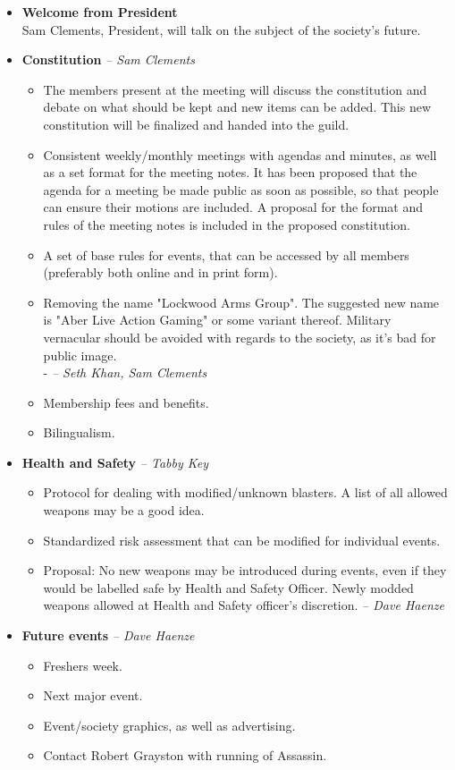 \documentclass{article}
\newcommand{\by}[1]{\hfill {\em-- #1}}
\begin{document}
	\begin{itemize}
		\item \textbf{Welcome from President} \\ Sam Clements, President, will talk on the subject of the society's future.
		\item \textbf{Constitution} \by{Sam Clements}
		\begin{itemize}
			\item The members present at the meeting will discuss the constitution and debate on what should be kept and new items can be added. This new constitution will be finalized and handed into the guild.
			\item Consistent weekly/monthly meetings with agendas and minutes, as well as a set format for the meeting notes. It has been proposed that the agenda for a meeting be made public as soon as possible, so that people can ensure their motions are included. A proposal for the format and rules of the meeting notes is included in the proposed constitution.
			\item A set of base rules for events, that can be accessed by all members (preferably both online and in print form).
			\item Removing the name "Lockwood Arms Group". The suggested new name is "Aber Live Action Gaming" or some variant thereof. Military vernacular should be avoided with regards to the society, as it's bad for public image. \\ - \by{Seth Khan, Sam Clements}
			\item Membership fees and benefits.
			\item Bilingualism.
		\end{itemize}

		\item \textbf{Health and Safety} \by{Tabby Key}
		\begin{itemize}
			\item Protocol for dealing with modified/unknown blasters. A list of all allowed weapons may be a good idea.
			\item Standardized risk assessment that can be modified for individual events.
			\item Proposal: No new weapons may be introduced during events, even if they would be labelled safe by Health and Safety Officer. Newly modded weapons allowed at Health and Safety officer's discretion. \by{Dave Haenze}
		\end{itemize}
 
		\item \textbf{Future events} \by{Dave Haenze}
		\begin{itemize}
			\item Freshers week.
			\item Next major event.
			\item Event/society graphics, as well as advertising.
			\item Contact Robert Grayston with running of Assassin.
		\end{itemize}
		

\end{itemize}
\end{document}
